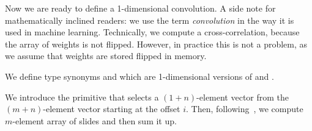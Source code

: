 Now we are ready to define a 1-dimensional convolution.
A side note for mathematically inclined readers: we use the term
\emph{convolution} in the way it is used in machine learning.  Technically,
we compute a cross-correlation, because the array of weights is not flipped.
However, in practice this is not a problem, as we assume that weights are
stored flipped in memory.

We define type synonyms  and  which are 1-dimensional versions
of  and .
We introduce the  primitive that selects a $(1+n)$-element vector
from the $(m+n)$-element vector starting at the offset $i$.  Then,
following~\cite{cnn-array}, we compute $m$-element array of slides
and then sum it up.
